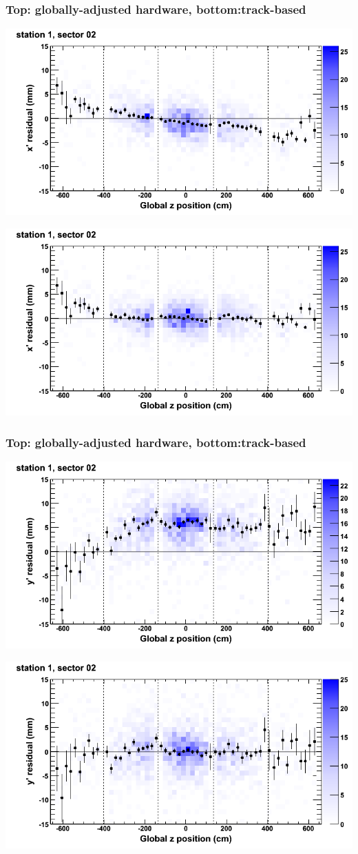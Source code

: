 \documentclass[compress]{beamer}
\begin{document}
\begin{frame}
\frametitle{Top: globally-adjusted hardware, bottom:track-based}
\includegraphics[width=0.7\linewidth]{NOV4_mapplots_HW/DTvsz_st1sec02_x.png}

\includegraphics[width=0.7\linewidth]{NOV4_mapplots/DTvsz_st1sec02_x.png}
\end{frame}

\begin{frame}
\frametitle{Top: globally-adjusted hardware, bottom:track-based}
\includegraphics[width=0.7\linewidth]{NOV4_mapplots_HW/DTvsz_st1sec02_y.png}

\includegraphics[width=0.7\linewidth]{NOV4_mapplots/DTvsz_st1sec02_y.png}
\end{frame}
\end{document}
